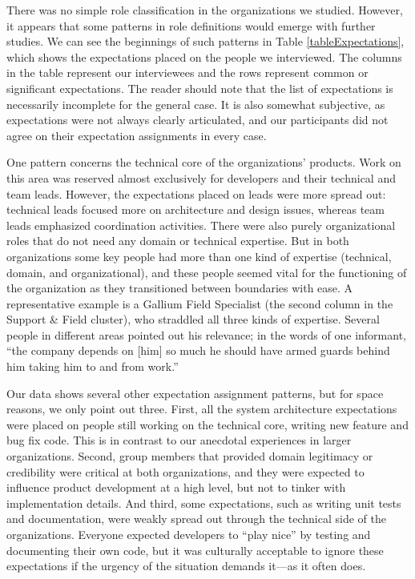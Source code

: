 \documentclass[10pt, conference, compsocconf]{IEEEtran}
\begin{document}
There was no simple role classification in the organizations we studied. However, it appears that some patterns in role definitions would emerge with further studies. We can see the beginnings of such patterns in Table \ref{tableExpectations}, which shows the expectations placed on the people we interviewed. The columns in the table represent our interviewees and the rows represent common or significant expectations. The reader should note that the list of expectations is necessarily incomplete for the general case. It is also somewhat subjective, as expectations were not always clearly articulated, and our participants did not agree on their expectation assignments in every case.

One pattern concerns the technical core of the organizations' products. Work on this area was reserved almost exclusively for developers and their technical and team leads. However, the expectations placed on leads were more spread out: technical leads focused more on architecture and design issues, whereas team leads emphasized coordination activities. There were also purely organizational roles that do not need any domain or technical expertise. But in both organizations some key people had more than one kind of expertise (technical, domain, and organizational), and these people seemed vital for the functioning of the organization as they transitioned between boundaries with ease. A representative example is a Gallium Field Specialist (the second column in the Support \& Field cluster), who straddled all three kinds of expertise. Several people in different areas pointed out his relevance; in the words of one informant, ``the company depends on [him] so much he should have armed guards behind him taking him to and from work.''

Our data shows several other expectation assignment patterns, but for space reasons, we only point out three. First, all the system architecture expectations were placed on people still working on the technical core, writing new feature and bug fix code. This is in contrast to our anecdotal experiences in larger organizations. Second, group members that provided domain legitimacy or credibility were critical at both organizations, and they were expected to influence product development at a high level, but not to tinker with implementation details. And third, some expectations, such as writing unit tests and documentation, were weakly spread out through the technical side of the organizations. Everyone expected developers to ``play nice'' by testing and documenting their own code, but it was culturally acceptable to ignore these expectations if the urgency of the situation demands it---as it often does.
\end{document}
